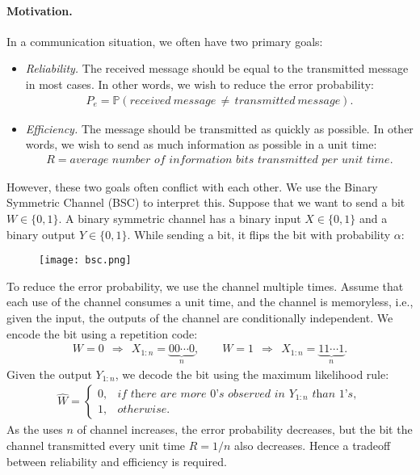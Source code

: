 \documentclass{article}
\numberwithin{equation}{section}
\newcommand{\bbP}{\mathbb{P}}
\newcommand{\wh}{\widehat}
\theoremstyle{plain}
\theoremstyle{definition}
\begin{document}
\paragraph{Motivation.} In a communication situation, we often have two primary goals:
\begin{itemize}
\item\textit{Reliability.} The received message should be equal to the transmitted message in most cases. In other words, we wish to reduce the error probability:
\begin{align*}
	P_e=\bbP\left(received\ message\,\neq\, transmitted\ message\right).
\end{align*}
\item\textit{Efficiency.} The message should be transmitted as quickly as possible. In other words, we wish to send as much information as possible in a unit time:
\begin{align*}
	R=\textit{average number of information bits transmitted per unit time}.
\end{align*}
\end{itemize}

However, these two goals often conflict with each other. We use the Binary Symmetric Channel (BSC) to interpret this. Suppose that we want to send a bit $W\in\{0,1\}$. A binary symmetric channel has a binary input $X\in\{0,1\}$ and a binary output $Y\in\{0,1\}$. While sending a bit, it flips the bit with probability $\alpha$:
\begin{figure}[H]
	\centering
	\texttt{[image: bsc.png]}
\end{figure}
To reduce the error probability, we use the channel multiple times. Assume that each use of the channel consumes a unit time, and the channel is memoryless, i.e., given the input, the outputs of the channel are conditionally independent. We encode the bit using a repetition code:
\begin{align*}
	W=0\ \ \Rightarrow\ \  X_{1:n}=\underbrace{00\cdots 0}_{n},\qquad  W=1\ \  \Rightarrow\ \ X_{1:n}=\underbrace{11\cdots 1}_{n}.
\end{align*}
Given the output $Y_{1:n}$, we decode the bit using the maximum likelihood rule:
\begin{align*}
	\wh{W}=\begin{cases}
		0, & \textit{if\ there\ are\ more\ 0's\ observed\ in\ $Y_{1:n}$\ than\ 1's},\\
		1, & otherwise.
	\end{cases}
\end{align*}
As the uses $n$ of channel increases, the error probability decreases, but the bit the channel transmitted every unit time $R=1/n$ also decreases. Hence a tradeoff between reliability and efficiency is required.
\end{document}
